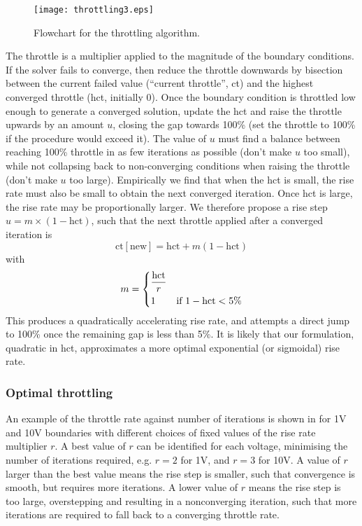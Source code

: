 \begin{figure}
\centering
\texttt{[image: throttling3.eps]}
\caption{Flowchart for the throttling algorithm. }
\label{fig:throttling_algorithm}
\end{figure}

The throttle is a multiplier
applied to the magnitude of the boundary conditions.
If the solver fails to converge, then reduce the throttle downwards by
bisection between the current failed value (``current throttle'', ct) and the highest converged
throttle (hct, initially 0). Once the boundary
condition is throttled low enough to generate a converged solution,
update the hct and raise
the throttle upwards by an amount $u$, closing the gap towards 100\% (set the throttle
to 100\% if the procedure would exceed it).  The value of $u$
must find a balance between reaching 100\% throttle in as few
iterations as possible (don't make $u$ too small), while not collapsing back to non-converging
conditions when raising the throttle (don't make $u$ too
large). Empirically we find that when the hct is small, the rise rate
must also be small to obtain the next converged iteration. Once hct is
large, the rise rate may be proportionally larger. We therefore
propose a rise step $u=m\times (1- \mathrm{hct})$, such that the next
throttle applied after a converged iteration is
\begin{equation}
  \mathrm{ct [new]} = \mathrm{hct} + m (1-\mathrm{hct})
\end{equation}
with
\begin{equation}
  m=
  \begin{dcases}
    \frac{\mathrm{hct}}{r} & \\
    1 & \text{if } 1-\mathrm{hct} < 5\%
  \end{dcases}
\end{equation}
This produces a quadratically accelerating rise rate,  and attempts a
direct jump to 100\% once the remaining gap is less than 5\%.  It is likely
that our formulation, quadratic in hct, approximates a more 
optimal exponential (or
sigmoidal) rise rate.

\subsubsection{Optimal throttling}
An example of
the  throttle rate against number of iterations is shown in
 for 1V and 10V boundaries with different
choices of fixed values of the rise rate multiplier $r$. A best value of $r$ can be identified
for each voltage, minimising the number of iterations required,
e.g. $r=2$ for 1V, and $r=3$ for 10V. A
value of $r$ larger than the best value means the rise step is
smaller, such that convergence is smooth, but requires more
iterations. A lower value of $r$ means the rise step is too large,
overstepping and resulting in a nonconverging iteration, such that
more iterations are required to fall back to a converging throttle rate.

